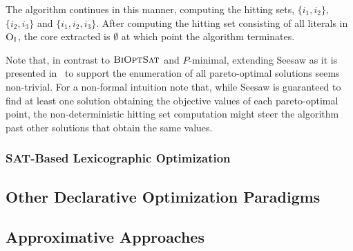 \begin{example}
  The algorithm continues in this manner, computing the hitting sets, $\{i_1, i_2\}$, $\{i_2, i_3\}$ and $\{i_1, i_2, i_3\}$. 
  After computing the hitting set consisting of all literals in $\textsc{O}_{\text{I}}$, the core extracted is $\emptyset$ at which point the algorithm terminates. 
\end{example}

Note that, in contrast to $\textsc{BiOptSat}$ and $P$-minimal, extending Seesaw as it is presented in~\textcite{DBLP:conf/cp/JanotaMSM21} to support the enumeration of all pareto-optimal solutions seems non-trivial.
For a non-formal intuition note that, while Seesaw is guaranteed to find at least one solution obtaining the objective values of each pareto-optimal point, the non-deterministic hitting set computation might steer the algorithm past other solutions that obtain the same values.

\subsubsection{SAT-Based Lexicographic Optimization\label{sec:lex-opt}}

\subsection{Other Declarative Optimization Paradigms\label{sec:other-approaches}}

\subsection{Approximative Approaches\label{sec:approximative}}
